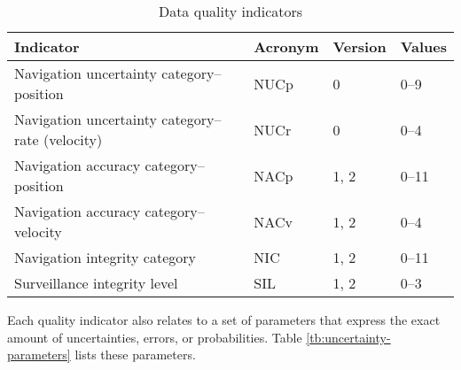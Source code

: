 \begin{table}[ht]
\caption{Data quality indicators}
\label{tb:measurement-quality-indicators}
\begin{tabular}{|l|l|l|l|}
\hline
\textbf{Indicator} & \textbf{Acronym} & \textbf{Version} & \textbf{Values} \\ \hline
Navigation uncertainty category--position & NUCp & 0 & 0--9 \\ \hline
Navigation uncertainty category--rate (velocity) & NUCr & 0 & 0--4 \\ \hline
Navigation accuracy category--position & NACp & 1, 2 & 0--11 \\ \hline
Navigation accuracy category--velocity & NACv & 1, 2 & 0--4 \\ \hline
Navigation integrity category & NIC & 1, 2 & 0--11 \\ \hline
Surveillance integrity level & SIL & 1, 2 & 0--3 \\ \hline
\end{tabular}
\end{table}

Each quality indicator also relates to a set of parameters that express the exact amount of uncertainties, errors, or probabilities. Table \ref{tb:uncertainty-parameters} lists these parameters.


